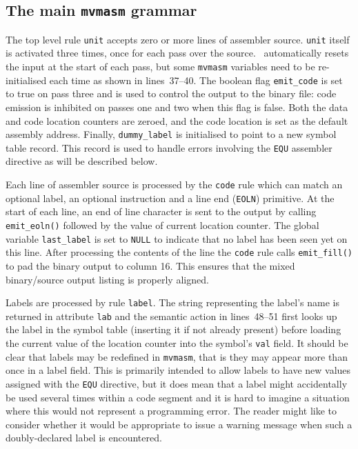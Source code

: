 \subsection{The main {\tt mvmasm} grammar}
The top level rule {\tt unit} accepts zero or more lines of assembler source. {\tt unit} itself
is activated three times, once for each pass over the source. \rdp\ automatically resets
the input at the start of each pass, but some {\tt mvmasm} variables need to be re-initialised
each time as shown in lines~37--40. The boolean flag \verb+emit_code+ is set to
{\sc true} on pass three and is used to control the output to the binary file: code emission
is inhibited on passes one and two when this flag is {\sc false}. Both the data and code
location counters are zeroed, and the code location is set as the default assembly address. 
Finally, \verb+dummy_label+ is initialised to point to a new symbol table record. This record is
used to handle errors involving the {\tt EQU} assembler directive as will be described below.

Each line of assembler source is processed by the {\tt code} rule which can match an 
optional label, an optional instruction and a line end ({\tt EOLN}) primitive. At the start
of each line, an end of line character is sent to the output by calling \verb+emit_eoln()+
followed by the value of current location counter. The global variable \verb+last_label+ is
set to {\tt NULL} to indicate that no label has been seen yet on this line. After processing
the contents of the line the {\tt code} rule calls \verb+emit_fill()+ to pad the binary output 
to column 16. This ensures that the mixed binary/source output listing is properly aligned.

Labels are processed by rule {\tt label}. The string representing the
label's name is returned in attribute {\tt lab} and the semantic action
in lines~48--51 first looks up the label in the symbol table (inserting
it if not already present) before loading the current value of the 
location counter into the symbol's {\tt val} field. It should be clear
that labels may be redefined in {\tt mvmasm}, that is they may appear
more than once in a label field. This is primarily intended to allow
labels to have new values assigned with the {\tt EQU} directive, but it does
mean that a label might  accidentally be used several times within a
code segment and it is hard to imagine a situation where this would not
represent a programming error. The reader might like to consider whether
it would be appropriate to issue a warning message when such a
doubly-declared label is encountered.

